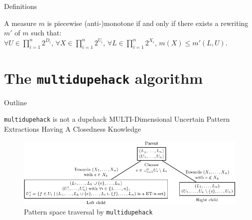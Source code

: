 \documentclass{beamer}
\newcommand{\mdh}{\texttt{multi\-dupe\-hack}}
\begin{document}
\begin{frame}[allowframebreaks]{Definitions}
\framebreak
  \begin{definition}
  A measure $m$ is piecewise (anti-)monotone if and only if there exists
  a rewriting $m'$ of $m$ such that:\\
  $\forall U \in \prod_{i = 1}^n 2^{D_i}$, $\forall X \in \prod_{i =
  1}^n 2^{U_i}$, $\forall L \in \prod_{i = 1}^n 2^{X_i}$, $m(X) \leq
  m'(L, U)$.
  \end{definition}
\end{frame}


\section{The \mdh{} algorithm}
\begin{frame}{Outline}
  \tableofcontents[currentsection]
\end{frame}

\begin{frame}{\mdh{} is not a dupehack}
  MULTI-Dimensional Uncertain Pattern Extractions Having A Closedness Knowledge
  \begin{figure}[htp]
  \centering
  \includegraphics[width=\textwidth]{tree-crop.pdf}
  \caption{Pattern space traversal by \mdh{}}
  \end{figure} 
\end{frame}
\end{document}
